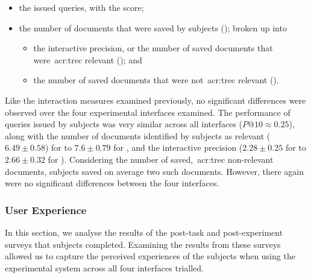 \begin{itemize}
    \item{the issued queries, with the  score;}
    \item{the number of documents that were saved by subjects (); broken up into}
    
    \begin{itemize}
        \item{the interactive precision, or the number of saved documents that were~\gls{acr:trec} relevant (); and}
        \item{the number of saved documents that were not~\gls{acr:trec} relevant ().}
    \end{itemize}
\end{itemize}

Like the interaction measures examined previously, no significant differences were observed over the four experimental interfaces examined. The performance of queries issued by subjects was very similar across all interfaces ($P@10 \approx 0.25$), along with the number of documents identified by subjects as relevant ($6.49\pm0.58$) for  to $7.6\pm0.79$ for , and the interactive precision ($2.28\pm0.25$ for  to $2.66\pm0.32$ for ). Considering the number of saved,~\gls{acr:trec} non-relevant documents, subjects saved on average two such documents. However, there again were no significant differences between the four interfaces.

\subsubsection{User Experience}\label{chap:snippets:user:results:ux}
In this section, we analyse the results of the post-task and post-experiment surveys that subjects completed. Examining the results from these surveys allowed us to capture the perceived experiences of the subjects when using the experimental system across all four interfaces trialled.

